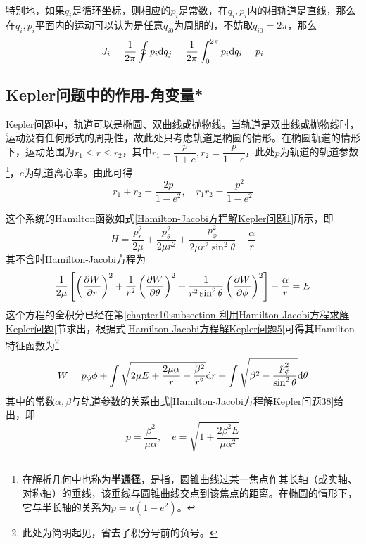 特别地，如果$q_i$是循环坐标，则相应的$p_i$是常数，在$q_i,p_i$内的相轨道是直线，那么在$q_i,p_i$平面内的运动可以认为是任意$q_{i0}$为周期的，不妨取$q_{i0}=2\pi$，那么
\begin{equation*}
	J_i = \frac{1}{2\pi}\oint p_i\mathrm{d} q_j = \frac{1}{2\pi} \int_0^{2\pi}p_i\mathrm{d} q_i = p_i
\end{equation*}

\subsection{Kepler问题中的作用-角变量*}

Kepler问题中，轨道可以是椭圆、双曲线或抛物线。当轨道是双曲线或抛物线时，运动没有任何形式的周期性，故此处只考虑轨道是椭圆的情形。在椭圆轨道的情形下，运动范围为$r_1\leqslant r \leqslant r_2$，其中$r_1=\dfrac{p}{1+e}, r_2=\dfrac{p}{1-e}$，此处$p$为轨道的轨道参数\footnote{在解析几何中也称为{\bf 半通径}，是指，圆锥曲线过某一焦点作其长轴（或实轴、对称轴）的垂线，该垂线与圆锥曲线交点到该焦点的距离。在椭圆的情形下，它与半长轴的关系为$p=a(1-e^2)$。}，$e$为轨道离心率。由此可得
\begin{equation}
	r_1+r_2 = \frac{2p}{1-e^2},\quad r_1r_2 = \frac{p^2}{1-e^2}
	\label{chapter10:Kepler问题中的作用-角变量：几何参数之间的关系}
\end{equation}

这个系统的Hamilton函数如式\eqref{Hamilton-Jacobi方程解Kepler问题1}所示，即
\begin{equation}
	H = \frac{p_r^2}{2\mu}+\frac{p_\theta^2}{2\mu r^2}+\frac{p_\phi^2}{2\mu r^2\sin^2\theta} - \frac{\alpha}{r}
	\label{chapter10:Kepler问题中的作用-角变量：Hamilton函数}
\end{equation}
其不含时Hamilton-Jacobi方程为
\begin{equation}
	\frac{1}{2\mu}\left[\left(\frac{\partial W}{\partial r}\right)^2 + \frac{1}{r^2}\left(\frac{\partial W}{\partial \theta}\right)^2 + \frac{1}{r^2\sin^2\theta}\left(\frac{\partial W}{\partial \phi}\right)^2\right] - \frac{\alpha}{r} = E
\end{equation}
这个方程的全积分已经在第\ref{chapter10:subsection-利用Hamilton-Jacobi方程求解Kepler问题}节求出，根据式\eqref{Hamilton-Jacobi方程解Kepler问题5}可得其Hamilton特征函数为\footnote{此处为简明起见，省去了积分号前的负号。}
\begin{equation}
	W = p_\phi\phi + \int \sqrt{2\mu E+\frac{2\mu\alpha}{r}-\frac{\beta^2}{r^2}} \mathrm{d} r + \int \sqrt{\beta^2-\frac{p_\phi^2}{\sin^2\theta}}\mathrm{d} \theta
\end{equation}
其中的常数$\alpha,\beta$与轨道参数的关系由式\eqref{Hamilton-Jacobi方程解Kepler问题38}给出，即
\begin{equation}
	p = \frac{\beta^2}{\mu\alpha},\quad e = \sqrt{1+\frac{2\beta^2E}{\mu\alpha^2}}
	\label{chapter10:Kepler问题中的作用-角变量：几何参数与积分常数之间的关系}
\end{equation}

